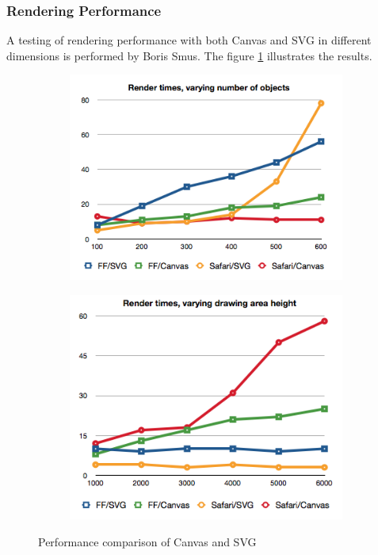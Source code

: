 \subsubsection{Rendering Performance}

A testing of rendering performance with both Canvas and SVG in different dimensions is performed by Boris Smus\cite{CanvasSVGcompare}. The figure \ref{fig:perf-comp-canvas-svg-tech} illustrates the results.

\begin{figure}[!htbp]
\centering
\begin{subfigure}{.5\textwidth}
  \centering
  \includegraphics[width=1\textwidth]{Figures/tech-svg-canvas-compare-2.png}
\end{subfigure}%
\begin{subfigure}{.5\textwidth}
  \centering
  \includegraphics[width=1\textwidth]{Figures/tech-svg-canvas-compare-1.png}
\end{subfigure}
\caption{Performance comparison of Canvas and SVG\cite{CanvasSVGcompare}}
\label{fig:perf-comp-canvas-svg-tech}
\end{figure}

